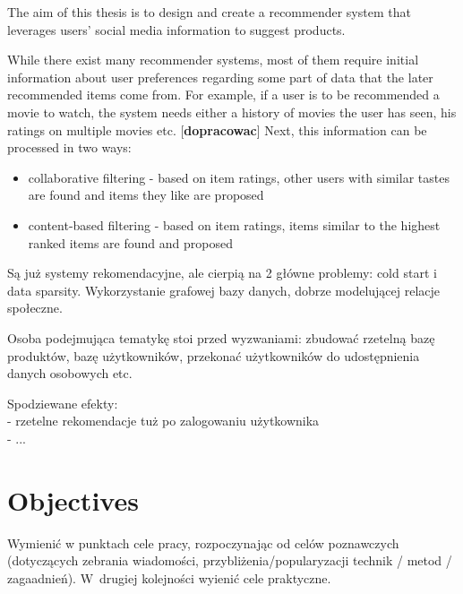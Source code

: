 \documentclass[12pt]{report}
\begin{document}
The aim of this thesis is to design and create a recommender system that leverages users' social media information to suggest products. 

While there exist many recommender systems, most of them require initial information about user preferences regarding some part of data that the later recommended items come from. For example, if a user is to be recommended a movie to watch, the system needs either a history of movies the user has seen, his ratings on multiple movies etc. [{\bf dopracowac}] Next, this information can be processed in two ways:
\begin{itemize}
\item collaborative filtering - based on item ratings, other users with similar tastes are found and items they like are proposed
\item content-based filtering - based on item ratings, items similar to the highest ranked items are found and proposed
\end{itemize}



Są już systemy rekomendacyjne, ale cierpią na 2 główne problemy: cold start i data sparsity. 
Wykorzystanie grafowej bazy danych, dobrze modelującej relacje społeczne.

Osoba podejmująca tematykę stoi przed wyzwaniami: zbudować rzetelną bazę produktów, bazę użytkowników, przekonać użytkowników do udostępnienia danych osobowych etc.

Spodziewane efekty:\\
- rzetelne rekomendacje tuż po zalogowaniu użytkownika\\
- ...\\



\section{Objectives}
Wymienić w punktach cele pracy, rozpoczynając od celów poznawczych (dotyczą\-cych
zebrania wiadomości, przybliżenia/popularyzacji technik / metod / zagaadnień).
W~drugiej kolejności wyienić cele praktyczne.
\end{document}
